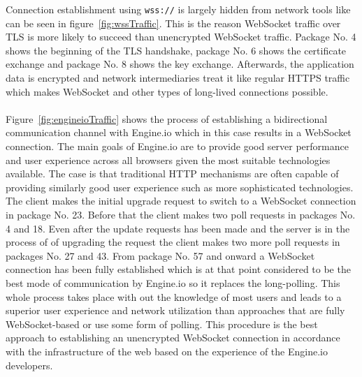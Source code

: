 \noindent
Connection establishment using \texttt{wss://} is largely hidden from network tools like can be seen in figure~\ref{fig:wssTraffic}. This is the reason WebSocket traffic over TLS is more likely to succeed than unencrypted WebSocket traffic. Package No. 4 shows the beginning of the TLS handshake, package No. 6 shows the certificate exchange and package No. 8 shows the key exchange. Afterwards, the application data is encrypted and network intermediaries treat it like regular HTTPS traffic which makes WebSocket and other types of long-lived connections possible.
\\ \\
Figure~\ref{fig:engineioTraffic} shows the process of establishing a bidirectional communication channel with Engine.io which in this case results in a WebSocket connection. The main goals of Engine.io are to provide good server performance and user experience across all browsers given the most suitable technologies available. The case is that traditional HTTP mechanisms are often capable of providing similarly good user experience such as more sophisticated technologies. The client makes the initial upgrade request to switch to a WebSocket connection in package No. 23. Before that the client makes two poll requests in packages No. 4 and 18. Even after the update requests has been made and the server is in the process of of upgrading the request the client makes two more poll requests in packages No. 27 and 43. From package No. 57 and onward a WebSocket connection has been fully established which is at that point considered to be the best mode of communication by Engine.io so it replaces the long-polling. This whole process takes place with out the knowledge of most users and leads to a superior user experience and network utilization than approaches that are fully WebSocket-based or use some form of polling. This procedure is the best approach to establishing an unencrypted WebSocket connection in accordance with the infrastructure of the web based on the experience of the Engine.io developers.

